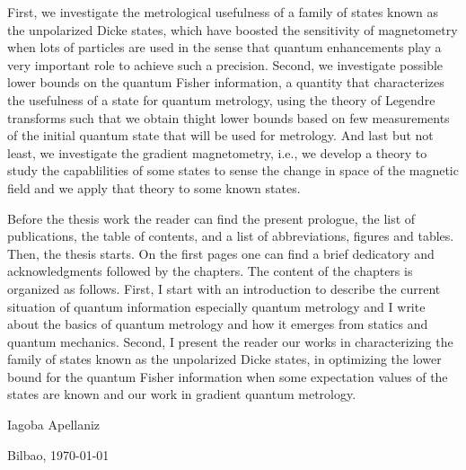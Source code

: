 First, we investigate the metrological usefulness of a family of states known as the unpolarized Dicke states, which have boosted the sensitivity of magnetometry when lots of particles are used in the sense that quantum enhancements play a very important role to achieve such a precision.
Second, we investigate possible lower bounds on the quantum Fisher information, a quantity that characterizes the usefulness of a state for quantum metrology, using the theory of Legendre transforms such that we obtain thight lower bounds based on few measurements of the initial quantum state that will be used for metrology.
And last but not least, we investigate the gradient magnetometry, i.e., we develop a theory to study the capablilities of some states to sense the change in space of the magnetic field and we apply that theory to some known states.

Before the thesis work the reader can find the present prologue, the list of publications, the table of contents, and a list of abbreviations, figures and tables.
Then, the thesis starts.
On the first pages one can find a brief dedicatory and acknowledgments followed by the chapters.
The content of the chapters is organized as follows.
First, I start with an introduction to describe the current situation of quantum information especially quantum metrology and I write about the basics of quantum metrology and how it emerges from statics and quantum mechanics.
Second, I present the reader our works in characterizing the family of states known as the unpolarized Dicke states, in optimizing the lower bound for the quantum Fisher information when some expectation values of the states are known and our work in gradient quantum metrology.

\begin{flushright}
  Iagoba Apellaniz

  Bilbao, \today
\end{flushright}
